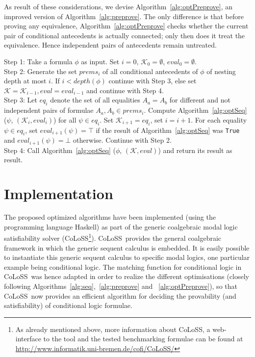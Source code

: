 \documentclass{entcs} \usepackage{entcsmacro}
\newcommand{\COLOSS}{{\textrm CoLoSS}}
\begin{document}
As result of these considerations, we devise Algorithm~\ref{alg:optPreprove},
an improved version of Algorithm~\ref{alg:preprove}. The only difference is
that before proving any equivalence, Algorithm~\ref{alg:optPreprove} checks
whether the current pair of conditional antecedents is actually connected;
only then does it treat the equivalence. Hence independent pairs of antecedents
remain untreated.


\begin{algorithm}[h]
\begin{alg}
\begin{upshape}
  Step 1: Take a formula $\phi$ as input. Set $i=0$, $\mathcal{K}_0=\emptyset$, $eval_0=\emptyset$.\\
  Step 2: Generate the set $prems_i$ of all conditional antecedents of $\phi$
  of nesting depth at most $i$. If $i<depth(\phi)$ continue
  with Step 3, else set $\mathcal{K}=\mathcal{K}_{i-1}, eval=eval_{i-1}$ and continue with Step 4.\\
  Step 3: Let $eq_i$ denote the set of all equalities $A_a = A_b$ for different and not independent
  pairs of formulae $A_a,A_b\in prems_i$. Compute
  Algorithm~\ref{alg:optSeq} ($\psi$, $(\mathcal{K}_i,eval_i)$) for all $\psi\in eq_i$.
  Set $\mathcal{K}_{i+1} = eq_i$, set $i = i + 1$. For each equality $\psi\in eq_i$,
  set $eval_{i+1}(\psi)=\top$ if the result of Algorithm~\ref{alg:optSeq} was \verb+True+
  and $eval_{i+1}(\psi)=\bot$ otherwise. Continue with Step 2.\\
  Step 4: Call Algorithm~\ref{alg:optSeq} ($\phi$, $(\mathcal{K},eval)$) and return its result
  as result.
\label{alg:optPreprove}
\end{upshape}
\end{alg}
\end{algorithm}

\section{Implementation}

The proposed optimized algorithms have been implemented (using the programming
language Haskell) as part of the generic coalgebraic modal logic satisfiability
solver (\COLOSS\footnote{As already mentioned above, more information about \COLOSS,
a web-interface to the tool and 
the tested benchmarking formulae can be found at \url{http://www.informatik.uni-bremen.de/cofi/CoLoSS/}}).
\COLOSS~provides the general coalgebraic framework in which the generic
sequent calculus is embedded. It is easily possible to instantiate this generic sequent
calculus to specific modal logics, one particular example being conditional logic.
The matching function for conditional logic in \COLOSS~was hence adapted in order to realize
the different optimisations (closely following Algorithms~\ref{alg:seq},~\ref{alg:preprove} and
~\ref{alg:optPreprove}), so that \COLOSS~now provides an efficient algorithm for
deciding the provability (and satisfiability) of conditional logic formulae.
\end{document}
